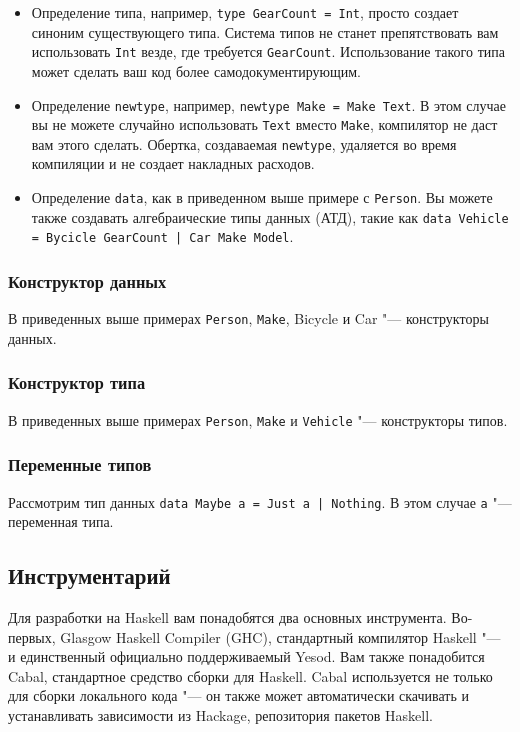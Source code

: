 \begin{itemize}
  \item Определение типа, например, \lstinline'type GearCount = Int', просто создает синоним существующего типа. Система типов не станет препятствовать вам использовать \lstinline'Int' везде, где требуется \lstinline'GearCount'. Использование такого типа может сделать ваш код более самодокументирующим.
  \item Определение \lstinline'newtype', например, \lstinline'newtype Make = Make Text'. В этом случае вы не можете случайно использовать \lstinline'Text' вместо \lstinline'Make', компилятор не даст вам этого сделать. Обертка, создаваемая \lstinline'newtype', удаляется во время компиляции и не создает накладных расходов.
  \item Определение \lstinline'data', как в приведенном выше примере с \lstinline'Person'. Вы можете также создавать алгебраические типы данных (АТД), такие как \lstinline'data Vehicle = Bycicle GearCount | Car Make Model'.
\end{itemize}

\subsubsection{Конструктор данных}

В приведенных выше примерах \lstinline'Person', \lstinline'Make', Bicycle и Car "--- конструкторы данных.

\subsubsection{Конструктор типа}

В приведенных выше примерах \lstinline'Person', \lstinline'Make' и \lstinline'Vehicle' "--- конструкторы типов.

\subsubsection{Переменные типов}

Рассмотрим тип данных \lstinline'data Maybe a = Just a | Nothing'. В этом случае \lstinline'a' "--- переменная типа.

\subsection{Инструментарий}

Для разработки на Haskell вам понадобятся два основных инструмента. Во-первых, Glasgow Haskell Compiler (GHC), стандартный компилятор Haskell "--- и единственный официально поддерживаемый Yesod. Вам также понадобится Cabal, стандартное средство сборки для Haskell. Cabal используется не только для сборки локального кода "--- он также может автоматически скачивать и устанавливать зависимости из Hackage, репозитория пакетов Haskell.


